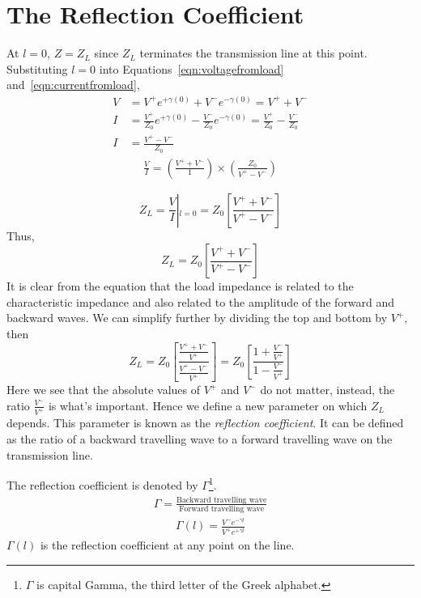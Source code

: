 \section{The Reflection Coefficient}
At $l = 0$, $Z = Z_L$ since $Z_L$ terminates the transmission line at this point. Substituting $l = 0$ into Equations~\eqref{eqn:voltagefromload} and~\eqref{eqn:currentfromload},
\begin{align*}
V &= V^+e^{+\gamma (0)}+V^-e^{-\gamma (0)} = V^+ + V^-\\
I &= \frac{V^+}{Z_0}e^{+\gamma (0)}-\frac{V^-}{Z_0}e^{-\gamma (0)} = \frac{V^+}{Z_0} - \frac{V^-}{Z_0} \\
I &= \frac{V^+ - V^-}{Z_0}
\end{align*}
\begin{align*}
\frac{V}{I} = \left( \frac{V^+ + V^-}{1}\right) \times \left( \frac{Z_0}{V^+ - V^-}\right) 
\end{align*}

\begin{equation*}
Z_{L} = \frac{V}{I}\left|_{l = 0} = Z_0 \left[ \frac{V^+ + V^-}{V^+ - V^-} \right]\right.  
\end{equation*}
Thus,
\begin{equation}
Z_L = Z_0 \left[\frac{V^+ + V^-}{V^+ - V^-} \right]
\end{equation}
It is clear from the equation that the load impedance is related to the characteristic impedance and also related to the amplitude of the forward and backward waves. We can simplify further by dividing the top and bottom by $V^+$, then
\begin{dmath}
Z_L = Z_0\left[ \frac{\frac{V^+ + V^-}{V^+}}{\frac{V^+ - V^-}{V^+}}\right]
= Z_0\left[ \frac{1+ \frac{V^-}{V^+}}{1 - \frac{V^-}{V^+}}\right] 
\label{eqn:impedatload}
\end{dmath}
Here we see that the absolute values of $V^+$ and $V^-$ do not matter, instead, the ratio $\frac{V^-}{V^+}$ is what's important. Hence we define a new parameter on which $Z_L$ depends. This parameter is known as the \emph{reflection coefficient}. It can be defined as the ratio of a backward travelling wave to a forward travelling wave on the transmission line.

The reflection coefficient is denoted by $\Gamma$\footnote{
$\Gamma$ is capital Gamma, the third letter of the Greek alphabet.
}.
\begin{align*}
\Gamma = \frac{\text{Backward travelling wave}}{\text{Forward travelling wave}}
\end{align*}
\begin{align}
\Gamma(l) = \frac{V^-e^{-\gamma l}}{V^+e^{+\gamma l}}
\label{eqn:rfc}
\end{align}
$\Gamma(l)$ is the reflection coefficient at any point on the line.

